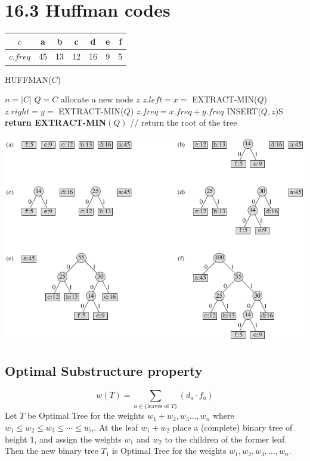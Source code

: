 \documentclass[a4paper]{article}
\begin{document}
\section*{16.3 Huffman codes}
    \begin{tabular}{c|cccccc}
         $c$ & a & b & c & d & e & f\\
         \hline
         $c.freq$& 45 & 13 & 12 & 16 & 9 & 5
    \end{tabular}
    \begin{algorithm}[H]%
        \caption{HUFFMAN($C$)}
        \begin{algorithmic}[1] %
            \State $n=|C|$
            \State $Q=C$
                \State allocate a new node $z$
                \State $z.left=x=$ EXTRACT-MIN($Q$)
                \State $z.right=y=$ EXTRACT-MIN($Q$)
                \State $z.freq=x.freq+y.freq$
                \State INSERT($Q,z$)S
            \EndFor
            \State \textbf{return EXTRACT-MIN}$(Q)$ // return the root of the tree
        \end{algorithmic}
    \end{algorithm}
    \includegraphics[width=\textwidth]{"huffman"}
\subsection*{Optimal Substructure property}
\begin{equation*}
w(T)=\sum_{a\in \{\text{leaves of }T\}}{(d_a \cdot f_a)}
\end{equation*}
Let $T$ be Optimal Tree for the weights $w_1+w_2,w_3\ldots,w_n$ where $w_1\leq w_2\leq w_3\leq \cdots \leq w_n$. At the leaf $w_1+w_2$ place a (complete) binary tree of height $1$, and assign the weights $w_1$ and $w_2$ to the children of the former leaf. Then the new binary tree $T_1$ is Optimal Tree for the weights $w_1, w_2, w_3, \ldots , w_n$. \\
\end{document}
